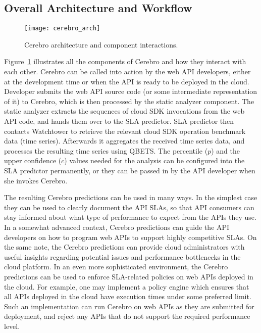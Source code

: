 \subsection{Overall Architecture and Workflow}

\begin{figure}
\centering
\texttt{[image: cerebro\_arch]}
\caption{Cerebro architecture and component interactions.}
\label{fig:cerebro_arch}
\end{figure}

Figure~\ref{fig:cerebro_arch} illustrates all the components of Cerebro and how they interact with each other. 
Cerebro can be called into action by the web API developers, either at the development time or when the
API is ready to be deployed in the cloud. Developer submits the web API source code (or some intermediate
representation of it) to Cerebro, which is then processed by the static analyzer component. The static
analyzer extracts the sequences of cloud SDK invocations from the web API code, and hands them over
to the SLA predictor. SLA predictor then contacts Watchtower to retrieve the relevant cloud SDK operation
benchmark data (time series). Afterwards it aggregates the received time series data, and processes
the resulting time series using QBETS. The percentile ($p$) and the upper confidence ($c$) values needed
for the analysis can be configured into the SLA predictor permanently, or they can be passed in by the API
developer when she invokes Cerebro. 

The resulting Cerebro predictions can be used in many ways. In the simplest case they can be
used to clearly document the API SLAs, so that API consumers can stay informed about what 
type of performance to expect from the APIs they use. In a somewhat advanced context, Cerebro
predictions can guide the API developers on how to program web APIs to support highly competitive
SLAs. On the same note, the Cerebro predictions can provide cloud administrators with
useful insights regarding potential issues and performance bottlenecks in the cloud platform. In an
even more sophisticated environment, the Cerebro predictions can be used to enforce SLA-related
policies on web APIs deployed in the cloud. For example, one may implement a policy engine which ensures
that all APIs deployed in the cloud have execution times under some preferred limit. Such an implementation
can run Cerebro on web APIs as they are submitted for deployment, and reject any APIs that do not
support the required performance level.